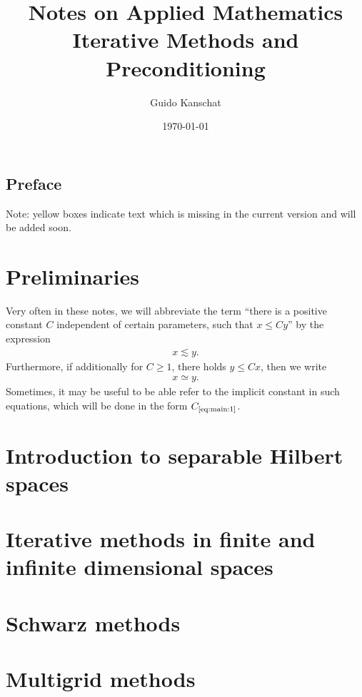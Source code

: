 \documentclass[USenglish]{report}
\title{\textbf{Notes on Applied Mathematics}
\\[5mm]
{\large Iterative Methods and Preconditioning}}
\author{Guido Kanschat}
\date{\today}
\def\constref#1{C_{\text{\ref{#1}}}}
\begin{document}
\maketitle

\section*{Preface}

\thispagestyle{empty}
\begin{todo}
  Note: yellow boxes indicate text which is missing in the current
  version and will be added soon.
\end{todo}
\setcounter{page}{0}

\tableofcontents

\chapter{Preliminaries}

\begin{notation}
  Very often in these notes, we will abbreviate the term ``there is a
  positive constant $C$ independent of certain parameters, such that $x \le C
  y$'' by the expression
  \begin{gather}
    \label{eq:main:1}
    x \lesssim y.
  \end{gather}
  Furthermore, if additionally for $C\ge 1$, there holds  $y \le Cx$,
  then we write
  \begin{gather*}
    x \simeq y.
  \end{gather*}
  Sometimes, it may be useful to be able refer to the implicit
  constant in such equations, which will be done in the form  $\constref{eq:main:1}$.
\end{notation}

\chapter{Introduction to separable Hilbert spaces}


\chapter{Iterative methods in finite and infinite dimensional spaces}





\chapter{Schwarz methods}
\label{cha:iteration:schwarz-methods}


\chapter{Multigrid methods}
\label{cha:iteration:multigrid-methods}


\printbibliography
\printindex
\end{document}
